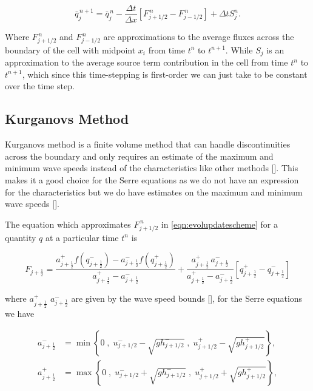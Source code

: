 \begin{equation}
\label{eqn:evolupdatescheme}
\bar{q}^{\,n + 1}_{j} = \bar{q}^{\,n}_{j} - \frac{\Delta t}{\Delta x} \left[F^{\,n} _{j+1/2} - F^{\,n} _{j-1/2} \right] + \Delta t S_{j}^n.
\end{equation}

Where $F^{\,n} _{j+1/2}$ and $F^{\,n} _{j-1/2}$ are approximations to the average fluxes across the boundary of the cell with midpoint $x_i$ from time $t^n$ to $t^{n+1}$. While $S_{j}$ is an approximation to the average source term contribution in the cell from time $t^n$ to $t^{n+1}$, which since this time-stepping is first-order we can just take to be constant over the time step. 

\subsection{Kurganovs Method}

Kurganovs method is a finite volume method that can handle discontinuities across the boundary and only requires an estimate of the maximum and minimum wave speeds instead of the characteristics like other methods []. This makes it a good choice for the Serre equations as we do not have an expression for the characteristics but we do have estimates on the maximum and minimum wave speeds []. 

The equation which approximates $F^{\,n} _{j+1/2}$ in \eqref{eqn:evolupdatescheme} for a quantity $q$ at a particular time $t^n$ is

\begin{equation}\label{eqn:HLL_flux}
F_{j+\frac{1}{2}} = \dfrac{a^+_{j+\frac{1}{2}} f\left(q^-_{j+\frac{1}{2}}\right) - a^-_{j+\frac{1}{2}} f\left(q^+_{j+\frac{1}{2}}\right)}{a^+_{j+\frac{1}{2}} - a^-_{j+\frac{1}{2}}}  + \dfrac{a^+_{j+\frac{1}{2}} \, a^-_{j+\frac{1}{2}}}{a^+_{j+\frac{1}{2}} - a^-_{j+\frac{1}{2}}} \left [ q^+_{j+\frac{1}{2}} - q^-_{j+\frac{1}{2}} \right ]
\end{equation}

where $a^+_{j+\frac{1}{2}}$ $a^-_{j+\frac{1}{2}}$ are given by the wave speed bounds [], for the Serre equations we have

\begin{align*}
a^-_{j+\frac{1}{2}} &= \min\left\lbrace 0\;,\;  u^-_{j + 1/2} - \sqrt{g h^-_{j + 1/2}}  \;,\;u^+_{j + 1/2} - \sqrt{g h^+_{j + 1/2}} \right\rbrace  ,\\
a^+_{j+\frac{1}{2}} &= \max\left\lbrace 0 \;,\;  u^-_{j + 1/2} + \sqrt{g h^-_{j + 1/2}}  \;,\;u^+_{j + 1/2} + \sqrt{g h^+_{j + 1/2}} \right\rbrace  ,
\end{align*}


